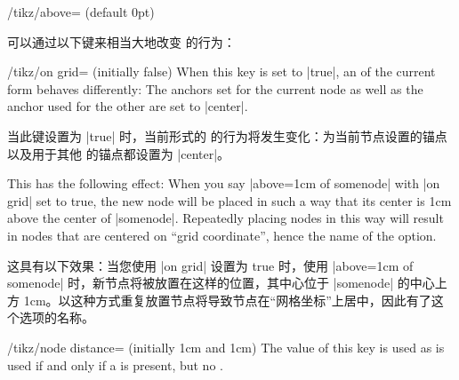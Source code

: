 \begin{key}{/tikz/above= (default 0pt)}
\begin{enumerate}
            可以通过以下键来相当大地改变  的行为：

            \begin{key}{/tikz/on grid= (initially false)}
                When this key is set to |true|, an  of the
                current form behaves differently: The anchors set for the
                current node as well as the anchor used for the other
                 are set to |center|.

                当此键设置为 |true| 时，当前形式的  的行为将发生变化：为当前节点设置的锚点以及用于其他  的锚点都设置为 |center|。

                This has the following effect: When you say
                |above=1cm of somenode| with |on grid| set to true, the new
                node will be placed in such a way that its center is 1cm above
                the center of |somenode|. Repeatedly placing nodes in this way
                will result in nodes that are centered on ``grid coordinate'',
                hence the name of the option.
                
                这具有以下效果：当您使用 |on grid| 设置为 true 时，使用 |above=1cm of somenode| 时，新节点将被放置在这样的位置，其中心位于 |somenode| 的中心上方 1cm。以这种方式重复放置节点将导致节点在“网格坐标”上居中，因此有了这个选项的名称。

\begin{codeexample}[preamble={\usetikzlibrary{positioning}}]
\end{codeexample}
            \end{key}
    \end{enumerate}

    \begin{key}{/tikz/node distance= (initially 1cm and 1cm)}
        The value of this key is used as  is used if and
        only if a  is present, but no .
        

\end{key}
\end{key}
